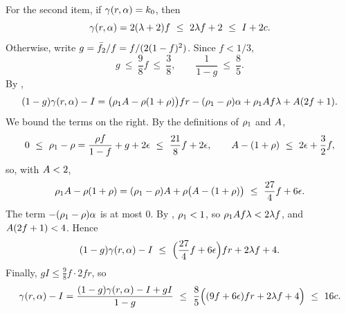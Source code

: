 \begin{proofof}{}
    For the second item, if $\gamma(r,\alpha)=k_0$, then
    \[
        \prn(r,\hgt)=2(\lambda+2)f\ \le\ 2\lambda f+2\ \le\ I+2c .
    \]
    Otherwise, write $g=\bar{f}_2/f=f/(2(1-f)^2)$. Since $f<1/3$,
    \[
        g\ \le\ \frac{9}{8}f\ \le\ \frac{3}{8},
        \qquad
        \frac{1}{1-g}\ \le\ \frac{8}{5} .
    \]
    By ,
    \[
        (1-g)\gamma(r,\alpha)-I=\big(\rho_1A-\rho(1+\rho)\big)fr
        -(\rho_1-\rho)\alpha+\rho_1A f\lambda+A(2f+1) .
    \]
    We bound the terms on the right. By the definitions of $\rho_1$ and
    $A$,
    \[
        0\ \le\ \advrone-\advr=\frac{\advr f}{1-f}+g+2\epsilon\ \le\ \frac{21}{8}f+2\epsilon,
        \qquad
        \maxr-(1+\advr)\ \le\ 2\epsilon+\frac{3}{2}f ,
    \]
    so, with $A<2$,
    \[
        \rho_1A-\rho(1+\rho)=(\rho_1-\rho)A+\rho\big(A-(1+\rho)\big)
        \ \le\ \frac{27}{4}f+6\epsilon .
    \]
    The term $-(\rho_1-\rho)\alpha$ is at most $0$. By ,
    $\rho_1<1$, so $\rho_1A f\lambda<2\lambda f$, and
    $A(2f+1)<4$. Hence
    \[
        (1-g)\prn(r,\hgt)-I\ \le\ \Big(\frac{27}{4}f+6\epsilon\Big)fr+2\lambda f+4 .
    \]
    Finally, $gI\le\frac{9}{8}f\cdot2fr$, so
    \[
        \prn(r,\hgt)-I=\frac{(1-g)\prn(r,\hgt)-I+gI}{1-g}
        \ \le\ \frac{8}{5}\Big((9f+6\epsilon)fr+2\lambda f+4\Big)\ \le\ 16c .
    \]
\end{proofof}
